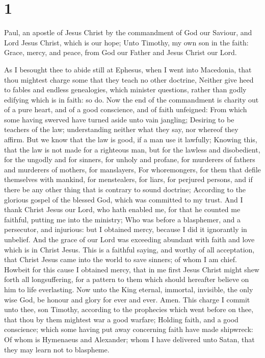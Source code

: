 \hypertarget{section}{%
\section{1}\label{section}}

 Paul, an apostle of Jesus Christ by the commandment of God
our Saviour, and Lord Jesus Christ, which is our hope;  Unto
Timothy, my own son in the faith: Grace, mercy, and peace, from God our
Father and Jesus Christ our Lord.

 As I besought thee to abide still at Ephesus, when I went
into Macedonia, that thou mightest charge some that they teach no other
doctrine,  Neither give heed to fables and endless
genealogies, which minister questions, rather than godly edifying which
is in faith: so do.  Now the end of the commandment is
charity out of a pure heart, and of a good conscience, and of faith
unfeigned:  From which some having swerved have turned aside
unto vain jangling;  Desiring to be teachers of the law;
understanding neither what they say, nor whereof they affirm.
 But we know that the law is good, if a man use it lawfully;
 Knowing this, that the law is not made for a righteous man,
but for the lawless and disobedient, for the ungodly and for sinners,
for unholy and profane, for murderers of fathers and murderers of
mothers, for manslayers,  For whoremongers, for them that
defile themselves with mankind, for menstealers, for liars, for perjured
persons, and if there be any other thing that is contrary to sound
doctrine;  According to the glorious gospel of the blessed
God, which was committed to my trust.  And I thank Christ
Jesus our Lord, who hath enabled me, for that he counted me faithful,
putting me into the ministry;  Who was before a blasphemer,
and a persecutor, and injurious: but I obtained mercy, because I did it
ignorantly in unbelief.  And the grace of our Lord was
exceeding abundant with faith and love which is in Christ Jesus.
 This is a faithful saying, and worthy of all acceptation,
that Christ Jesus came into the world to save sinners; of whom I am
chief.  Howbeit for this cause I obtained mercy, that in me
first Jesus Christ might shew forth all longsuffering, for a pattern to
them which should hereafter believe on him to life everlasting.
 Now unto the King eternal, immortal, invisible, the only
wise God, be honour and glory for ever and ever. Amen. 
This charge I commit unto thee, son Timothy, according to the prophecies
which went before on thee, that thou by them mightest war a good
warfare;  Holding faith, and a good conscience; which some
having put away concerning faith have made shipwreck:  Of
whom is Hymenaeus and Alexander; whom I have delivered unto Satan, that
they may learn not to blaspheme.

